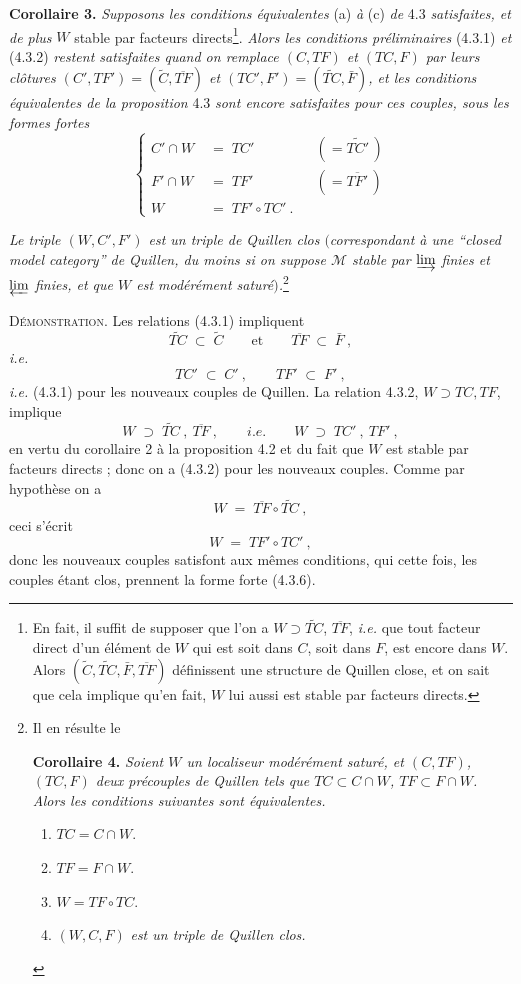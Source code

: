 \documentclass[11pt]{article}
\newcommand{\printedpage}[1]{\marginpar{\footnotesize p.~#1}}
\newcommand{\msp}[1]{\marginpar{\footnotesize [#1]}}
\begin{document}
\textbf{Corollaire 3.} \textit{Supposons les conditions équivalentes} (a) \textit{à} (c) \textit{de} 4.3 \textit{satisfaites, et de plus} $W$ stable par facteurs directs\footnote[12]{En fait, il suffit de supposer que l'on a $W\supset\widetilde{TC}$, $\overline{TF}$, \textit{i.e.} que tout facteur direct d'un élément de $W$ qui est soit dans $C$, soit dans $F$, est encore dans $W$. Alors $(\widetilde{C},\widetilde{TC},\bar{F},\overline{TF})$ définissent une structure de Quillen close, et on sait que cela implique qu'en fait, $W$ lui aussi est stable par facteurs directs.}. \textit{Alors les conditions préliminaires} (4.3.1) \textit{et} (4.3.2) \textit{restent satisfaites quand on remplace $(C,TF)$ et $(TC,F)$ par leurs clôtures $(C',TF')=(\widetilde{C},\overline{TF})$ et $(TC',F')=(\widetilde{TC},\bar{F})$, et les conditions équivalentes de la proposition} 4.3 \textit{sont encore satisfaites pour ces couples, sous les formes fortes}
\[
\left\{
\begin{aligned}
C'\cap W &\;=\; TC' && (=\widetilde{TC'}\,)\\
F'\cap W &\;=\; TF' && (=\overline{TF'}\,)\\
W &\;=\; TF'\circ TC'\ .
\end{aligned}
\right.
\tag*{(4.3.6)}
\]

\msp{page 36}
\textit{Le triple $(W,C',F')$ est un triple de Quillen clos $($correspondant à une “closed model category” de Quillen, du moins si on suppose $\mathcal{M}$ stable par $\varinjlim$ finies et $\varprojlim$ finies, et que $W$ est modérément saturé$)$.}\footnote[13]{Il en résulte le\par
\textbf{Corollaire 4.} \textit{Soient $W$ un localiseur modérément saturé, et $(C,TF)$, $(TC,F)$ deux précouples de Quillen tels que $TC\subset C\cap W$, $TF\subset F\cap W$. Alors les conditions suivantes sont équivalentes.}
\begin{enumerate}[leftmargin=*]
\item[a)] $TC=C\cap W$.
\item[b)] $TF=F\cap W$.
\item[c)] $W=TF\circ TC$.
\item[d)] $(W,C,F)$ \textit{est un triple de Quillen clos.}
\end{enumerate}}

\textsc{Démonstration.} Les relations (4.3.1) impliquent
\[
\widetilde{TC}\;\subset\;\widetilde{C}\qquad\text{et}\qquad\overline{TF}\;\subset\;\bar{F}\ ,
\]
\printedpage{25}
\textit{i.e.}
\[
TC'\;\subset\;C'\ ,\qquad TF'\;\subset\;F'\ ,
\]
\textit{i.e.} (4.3.1) pour les nouveaux couples de Quillen. La relation 4.3.2, $W\supset TC,TF$, implique
\[
W\;\supset\;\widetilde{TC}\ ,\ \overline{TF}\ ,\qquad \textit{i.e.}\qquad W\;\supset\;TC'\ ,\ TF'\ ,
\]
en vertu du corollaire 2 à la proposition 4.2 et du fait que $W$ est stable par facteurs directs ; donc on a (4.3.2) pour les nouveaux couples. Comme par hypothèse on a
\[
W\;=\;\overline{TF}\circ\widetilde{TC}\ ,
\]
ceci s'écrit
\[
W\;=\;TF'\circ TC'\ ,
\]
donc les nouveaux couples satisfont aux mêmes conditions, qui cette fois, les couples étant clos, prennent la forme forte (4.3.6).
\end{document}
